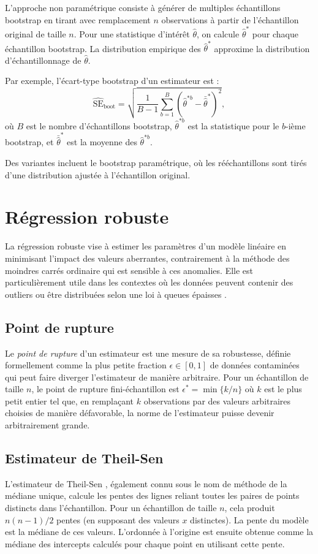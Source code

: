 L'approche non paramétrique consiste à générer de multiples échantillons bootstrap en tirant avec remplacement $n$ observations à partir de l'échantillon original de taille $n$. Pour une statistique d'intérêt $\hat{\theta}$, on calcule $\hat{\theta}^*$ pour chaque échantillon bootstrap. La distribution empirique des $\hat{\theta}^*$ approxime la distribution d'échantillonnage de $\hat{\theta}$.

Par exemple, l'écart-type bootstrap d'un estimateur est :
\begin{equation}
	\widehat{\mathrm{SE}}_{\mathrm{boot}} = \sqrt{\frac{1}{B-1} \sum_{b=1}^B (\hat{\theta}^{*b} - \bar{\hat{\theta}}^*)^2},
\end{equation}
où $B$ est le nombre d'échantillons bootstrap, $\hat{\theta}^{*b}$ est la statistique pour le $b$-ième bootstrap, et $\bar{\hat{\theta}}^*$ est la moyenne des $\hat{\theta}^{*b}$.

Des variantes incluent le bootstrap paramétrique, où les rééchantillons sont tirés d'une distribution ajustée à l'échantillon original.

\section{Régression robuste}
La régression robuste \citep{andersen2008modern} vise à estimer les paramètres d'un modèle linéaire en minimisant l'impact des valeurs aberrantes, contrairement à la méthode des moindres carrés ordinaire qui est sensible à ces anomalies. Elle est particulièrement utile dans les contextes où les données peuvent contenir des outliers ou être distribuées selon une loi à queues épaisses \citep{taleb2020statistical}.

\subsection{Point de rupture}
Le \emph{point de rupture} \citep{rousseeuw2003robust} d'un estimateur est une mesure de sa robustesse, définie formellement comme la plus petite fraction $\epsilon \in [0,1]$ de données contaminées qui peut faire diverger l'estimateur de manière arbitraire. Pour un échantillon de taille $n$, le point de rupture fini-échantillon est $\epsilon^* = \min\{k/n\}$ où $k$ est le plus petit entier tel que, en remplaçant $k$ observations par des valeurs arbitraires choisies de manière défavorable, la norme de l'estimateur puisse devenir arbitrairement grande.

\subsection{Estimateur de Theil-Sen}
L'estimateur de Theil-Sen \citep{theil1950rank, sen1968estimates}, également connu sous le nom de méthode de la médiane unique, calcule les pentes des lignes reliant toutes les paires de points distincts dans l'échantillon. Pour un échantillon de taille $n$, cela produit $n(n-1)/2$ pentes (en supposant des valeurs $x$ distinctes). La pente du modèle est la médiane de ces valeurs. L'ordonnée à l'origine est ensuite obtenue comme la médiane des intercepts calculés pour chaque point en utilisant cette pente.
 
